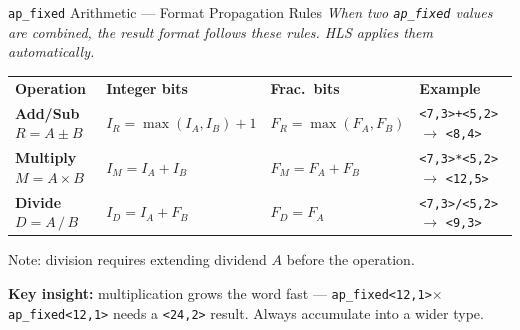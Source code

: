 \documentclass[aspectratio=169,12pt]{beamer}
\begin{document}
\begin{frame}[t]{\texttt{ap\_fixed} Arithmetic --- Format Propagation Rules}
\vspace{0.06cm}
{\small\color{MidGray}\itshape
  When two \texttt{ap\_fixed} values are combined, the result format follows
  these rules. HLS applies them automatically.}
\vspace{0.1cm}
{\setlength{\extrarowheight}{3pt}
\begin{tabular}{p{2.8cm}p{3.4cm}p{3.2cm}p{2.8cm}}
\rowcolor{Navy}
\textbf{\color{white}Operation} &
\textbf{\color{white}Integer bits} &
\textbf{\color{white}Frac.\ bits} &
\textbf{\color{white}Example}\\
\textbf{Add/Sub} $R = A \pm B$ &
$I_R = \max(I_A, I_B)+1$ &
$F_R = \max(F_A, F_B)$ &
{\small\texttt{<7,3>+<5,2>} $\to$ \texttt{<8,4>}}\\
\rowcolor{Navy!8}
\textbf{Multiply} $M = A \times B$ &
$I_M = I_A + I_B$ &
$F_M = F_A + F_B$ &
{\small\texttt{<7,3>*<5,2>} $\to$ \texttt{<12,5>}}\\
\textbf{Divide} $D = A \,/\, B$ &
$I_D = I_A + F_B$ &
$F_D = F_A$ &
{\small\texttt{<7,3>/<5,2>} $\to$ \texttt{<9,3>}}\\
\end{tabular}}
\vspace{0.08cm}
{\small\color{MidGray} Note: division requires extending dividend $A$ before the operation.}
\vspace{0.06cm}
\colorbox{Orange!10}{\parbox{\textwidth}{%
  \vspace{1pt}
  {\small\color{NavyDk}
    \textbf{Key insight:} multiplication grows the word fast ---
    \texttt{ap\_fixed<12,1>}$\times$\texttt{ap\_fixed<12,1>} needs a \texttt{<24,2>} result.
    Always accumulate into a wider type.}
  \vspace{1pt}
}}
\end{frame}
\end{document}
